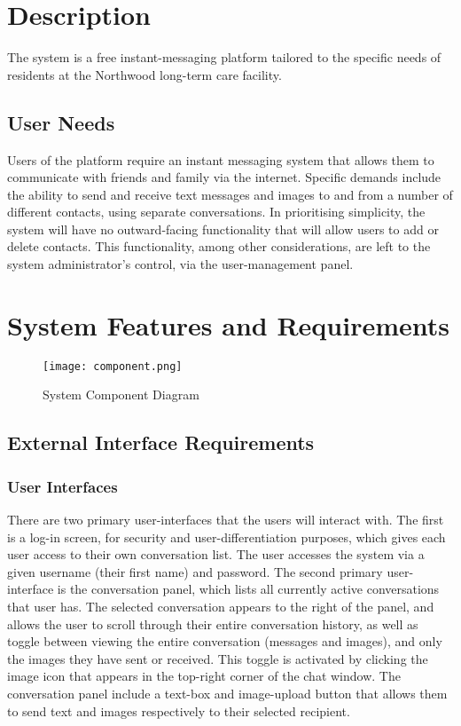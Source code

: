 \documentclass[11pt]{article}
\begin{document}
\section{Description}
The system is a free instant-messaging platform tailored to the specific needs of residents at the
Northwood long-term care facility.

\subsection{User Needs}
Users of the platform require an instant messaging system that allows them to communicate with
friends and family via the internet. Specific demands include the ability to send and receive text
messages and images to and from a number of different contacts, using separate conversations. In
prioritising simplicity, the system will have no outward-facing functionality that will allow users
to add or delete contacts. This functionality, among other considerations, are left to the system
administrator's control, via the user-management panel.

\section{System Features and Requirements}

\begin{figure}[!htb]
  \centering
  \texttt{[image: component.png]}
  \caption{System Component Diagram}
\end{figure}

\subsection{External Interface Requirements}
\subsubsection{User Interfaces}
There are two primary user-interfaces that the users will interact with. The first is a log-in
screen, for security and user-differentiation purposes, which gives each user access to their own
conversation list. The user accesses the system via a given username (their first name) and
password. The second primary user-interface is the conversation panel, which lists all currently active
conversations that user has. The selected conversation appears to the right of the panel, and allows
the user to scroll through their entire conversation history, as well as toggle between viewing the
entire conversation (messages and images), and only the images they have sent or received. This
toggle is activated by clicking the image icon that appears in the top-right corner of the chat
window. The conversation panel include a text-box and image-upload button that allows them to send
text and images respectively to their selected recipient.\newline
\end{document}
